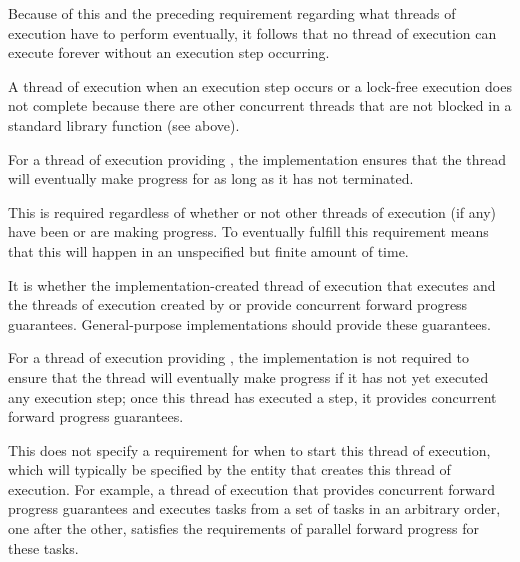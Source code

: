 \pnum
\begin{note}
Because of this and the preceding requirement regarding what threads of execution
have to perform eventually, it follows that no thread of execution can execute
forever without an execution step occurring.
\end{note}

\pnum
A thread of execution 
when an execution step occurs or a
lock-free execution does not complete because there are other concurrent threads
that are not blocked in a standard library function (see above).

\pnum
{}%
For a thread of execution providing ,
the implementation ensures that the thread will eventually make progress for as
long as it has not terminated.
\begin{note}
This is required regardless of whether or not other threads of execution (if any)
have been or are making progress. To eventually fulfill this requirement means that
this will happen in an unspecified but finite amount of time.
\end{note}

\pnum
It is  whether the
implementation-created thread of execution that executes
 and the threads of execution created by
or 
provide concurrent forward progress guarantees.
General-purpose implementations should provide these guarantees.

\pnum
{}%
For a thread of execution providing ,
the implementation is not required to ensure that the thread will eventually make
progress if it has not yet executed any execution step; once this thread has
executed a step, it provides concurrent forward progress guarantees.

\pnum
\begin{note}
This does not specify a requirement for when to start this thread of execution,
which will typically be specified by the entity that creates this thread of
execution. For example, a thread of execution that provides concurrent forward
progress guarantees and executes tasks from a set of tasks in an arbitrary order,
one after the other, satisfies the requirements of parallel forward progress for
these tasks.
\end{note}

